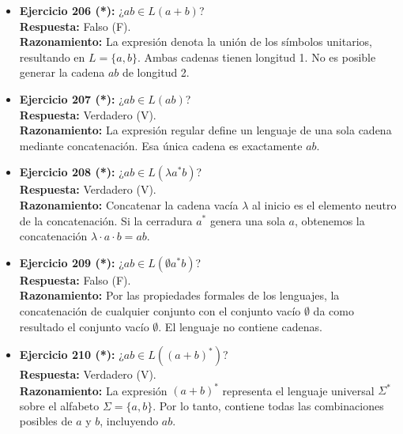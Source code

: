 \documentclass[12pt]{article}
\begin{document}
\begin{itemize}
    \vspace{0.2cm}
    \item \textbf{Ejercicio 206 (*):} ¿$ab \in L(a+b)$? \\
    \textbf{Respuesta:} Falso (F). \\
    \textbf{Razonamiento:} La expresión denota la unión de los símbolos unitarios, resultando en $L = \{a, b\}$. Ambas cadenas tienen longitud 1. No es posible generar la cadena $ab$ de longitud 2.
    
    \vspace{0.2cm}
    \item \textbf{Ejercicio 207 (*):} ¿$ab \in L(ab)$? \\
    \textbf{Respuesta:} Verdadero (V). \\
    \textbf{Razonamiento:} La expresión regular define un lenguaje de una sola cadena mediante concatenación. Esa única cadena es exactamente $ab$.
    
    \vspace{0.2cm}
    \item \textbf{Ejercicio 208 (*):} ¿$ab \in L(\lambda a^*b)$? \\
    \textbf{Respuesta:} Verdadero (V). \\
    \textbf{Razonamiento:} Concatenar la cadena vacía $\lambda$ al inicio es el elemento neutro de la concatenación. Si la cerradura $a^*$ genera una sola $a$, obtenemos la concatenación $\lambda \cdot a \cdot b = ab$.
    
    \vspace{0.2cm}
    \item \textbf{Ejercicio 209 (*):} ¿$ab \in L(\emptyset a^*b)$? \\
    \textbf{Respuesta:} Falso (F). \\
    \textbf{Razonamiento:} Por las propiedades formales de los lenguajes, la concatenación de cualquier conjunto con el conjunto vacío $\emptyset$ da como resultado el conjunto vacío $\emptyset$. El lenguaje no contiene cadenas.
    
    \vspace{0.2cm}
    \item \textbf{Ejercicio 210 (*):} ¿$ab \in L((a+b)^*)$? \\
    \textbf{Respuesta:} Verdadero (V). \\
    \textbf{Razonamiento:} La expresión $(a+b)^*$ representa el lenguaje universal $\Sigma^*$ sobre el alfabeto $\Sigma = \{a, b\}$. Por lo tanto, contiene todas las combinaciones posibles de $a$ y $b$, incluyendo $ab$.
    

\end{itemize}
\end{document}
